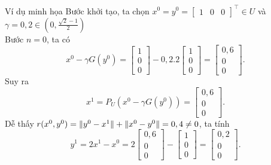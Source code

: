 \documentclass[aspectratio=169]{beamer}
\DeclarePairedDelimiter{\norm}{\lVert}{\rVert}
\theoremstyle{plain}
\theoremstyle{definition}
\theoremstyle{remark}
\begin{document}
\begin{frame}{Ví dụ minh họa}
Bước khởi tạo, ta chọn $x^0=y^0=\begin{bmatrix}1&0&0\end{bmatrix}^\top\in U$ và $\gamma=0,2\in(0,\frac{\sqrt{2}-1}{2})$\\
Bước $n=0$, ta có 
    $$x^0-\gamma G(y^0)= \begin{bmatrix}
    1\\0\\0
    \end{bmatrix}-0,2.2\begin{bmatrix}
    1\\0\\0
    \end{bmatrix}= \begin{bmatrix}
    0,6\\0\\0
    \end{bmatrix}.$$
    Suy ra 
    $$x^1=P_U(x^0-\gamma G(y^0))=\begin{bmatrix}
    0,6\\0\\0
    \end{bmatrix}.$$
    Dễ thấy $r(x^0,y^0)=\norm{y^0-x^1}+\norm{x^0-y^0}=0,4\neq0$, ta tính $$
    y^1 = 2x^1-x^0=2\begin{bmatrix}
    0,6\\0\\0
    \end{bmatrix}-\begin{bmatrix}
    1\\0\\0
    \end{bmatrix}=\begin{bmatrix}
    0,2\\0\\0
    \end{bmatrix}.
    $$
\end{frame}
\end{document}
